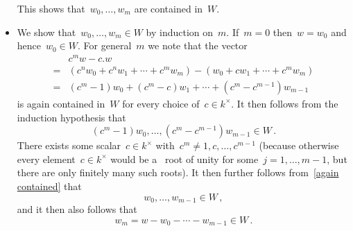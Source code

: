 \begin{itemize}
    This shows that~$w_0, \dotsc, w_m$ are contained in~$W$.
  \item
    We show that~$w_0, \dotsc, w_m \in W$ by induction on~$m$.
    If~$m = 0$ then~$w = w_0$ and hence~$w_0 \in W$.
    For general~$m$ we note that the vector
    \begin{align*}
       {}&  c^m w - c.w \\
      ={}&  (c^n w_0 + c^n w_1 + \dotsb + c^m w_m) - (w_0 + c w_1 + \dotsb + c^m w_m) \\
      ={}&  (c^m - 1) w_0 + (c^m - c) w_1 + \dotsb + (c^m - c^{m-1}) w_{m-1}
    \end{align*}
    is again contained in~$W$ for every choice of~$c \in k^\times$.
    It then follows from the induction hypothesis that
    \begin{equation}
      \label{again contained}
      (c^m - 1) w_0, \dotsc, (c^m - c^{m-1}) w_{m-1} \in W \,.
    \end{equation}
    There exists some scalar~$c \in k^\times$ with~$c^m \neq 1, c, \dots, c^{m-1}$ (because otherwise every element~$c \in k^\times$ would be a~ root of unity for some~$j = 1, \dotsc, m-1$, but there are only finitely many such roots).
    It then further follows from~\eqref{again contained} that
    \[
      w_0, \dotsc, w_{m-1} \in W \,,
    \]
    and it then also follows that
    \[
          w_m
      =   w - w_0 - \dotsb - w_{m-1}
      \in W \,.
    \]
\end{itemize}




